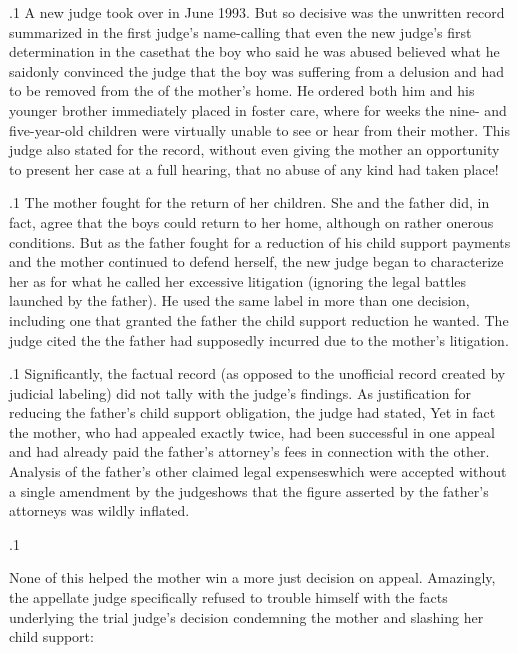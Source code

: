 \documentclass[11pt, twoside]{article}
\begin{document}
{\p.1{%
A new judge took over in June 1993. But so decisive was the unwritten
record summarized in the first judge’s name-calling that even the new
judge’s first determination in the case\mdash{}that the boy who said he was
abused believed what he said\mdash{}only convinced the judge that the boy
was suffering from a delusion and had to be removed from the  of the mother’s home. He ordered both him and his younger
brother immediately placed in foster care, where for weeks
the nine- and five-year-old children were virtually unable to see or hear from their
mother. This judge also stated for the record, without even giving the
mother an opportunity to present her case at a full hearing, that no abuse
of any kind had taken place!
}%

\p.1{%
The mother fought for the return of her children. She and the father did, in fact, agree that the boys could return to her home, although
on rather onerous conditions. But as the father fought for a reduction
of his child support payments and the mother continued to defend
herself, the new judge began to characterize her as  for what he called her excessive litigation (ignoring the legal
battles launched by the father). He used the same label in more than
one decision, including one that granted the father the child support
reduction he wanted. The judge cited the 
the father had supposedly incurred due to the mother’s  litigation.
}%

\p.1{%
Significantly, the factual record (as opposed to the unofficial record
created by judicial labeling) did not tally with the judge’s findings. As
justification for reducing the father’s child support obligation, the judge
had stated,  Yet in fact the mother, who
had appealed exactly twice, had been successful in one appeal and had
already paid the father’s attorney’s fees in connection with the other.
Analysis of the father’s other claimed legal expenses\mdash{}which were accepted without a single amendment by the judge\mdash{}shows that the figure
asserted by the father’s attorneys was wildly inflated.
}%

\p.1{%
None of this helped the mother win a more just decision on appeal.
Amazingly, the appellate judge specifically refused to trouble himself
with the facts underlying the trial judge’s decision condemning the
mother and slashing her child support:

}}
\end{document}
